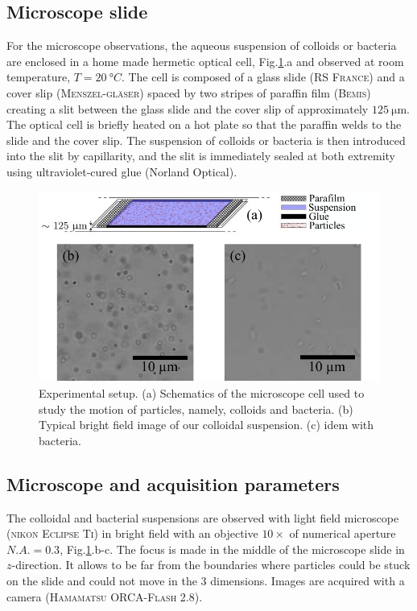 \documentclass[prb,reprint,amsmath,amssymb]{revtex4-1}
\newcommand{\tg}[1]{{\color{magenta}#1}} %
\begin{document}
\subsection{Microscope slide}
For the microscope observations, the aqueous suspension of colloids or bacteria are enclosed in a home made hermetic optical cell, Fig.\ref{fig:Slide}.a and observed at room temperature, $T=\SI{20}{\degree C}$. The cell is composed of a  glass slide (\textsc{RS France}) and a cover slip (\textsc{Menszel-gl\"aser}) spaced by two stripes of paraffin film (\textsc{Bemis}) \tg{creating a slit between the glass slide and the cover slip of approximately $\SI{125}{\micro\meter}$}. The optical cell is briefly heated on a hot plate so that the paraffin welds to the slide and the cover slip. The suspension of colloids or bacteria is then introduced into the slit by capillarity, and the slit is immediately sealed at both extremity using ultraviolet-cured glue (Norland Optical).

\begin{figure}
\includegraphics[width=\linewidth]{Lamelle_Photos.pdf}
\caption{Experimental setup. (a) Schematics of the microscope cell used to study the motion of particles, namely, colloids and bacteria. (b) Typical bright field image of our colloidal suspension. (c) idem with bacteria.}
\label{fig:Slide}
\end{figure}

\subsection{Microscope and acquisition parameters}

The colloidal and bacterial suspensions are observed with light field microscope\cite{Mignard2015} (\textsc{nikon Eclipse Ti}) in \tg{bright field} with an objective $10 \times$ of numerical aperture $N.A. = 0.3$, Fig.\ref{fig:Slide}.b-c. The focus is made in the middle of the microscope slide in $z$-direction. It allows to be far from the boundaries where particles could be stuck on the slide and could not move in the 3 dimensions. Images are acquired with a camera (\textsc{Hamamatsu ORCA-Flash 2.8}).
\end{document}
